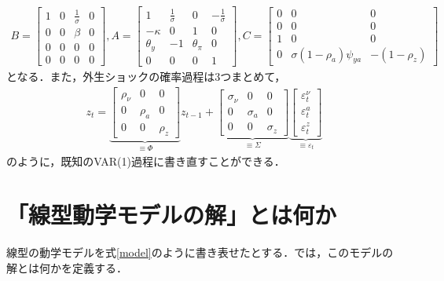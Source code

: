 \documentclass[a4j, dvipdfmx]{jarticle}
\begin{document}
\begin{align}
B = \begin{bmatrix}
1 & 0 & \frac{1}{\sigma} & 0 \\
0 & 0 & \beta & 0 \\
0 & 0 & 0 & 0 \\
0 & 0 & 0 & 0
\end{bmatrix},
A = \begin{bmatrix}
1 & \frac{1}{\sigma} & 0 & -\frac{1}{\sigma} \\
-\kappa & 0 & 1 & 0 \\
\theta_y & -1 & \theta_\pi & 0 \\
0 & 0 & 0 & 1
\end{bmatrix},
C = \begin{bmatrix}0 & 0 & 0 \\
0 & 0 & 0 \\
1 & 0 & 0 \\
0 & \sigma (1-\rho_a) \psi_{ya} & -(1-\rho_z)
\end{bmatrix}
\end{align}
となる．また，外生ショックの確率過程は3つまとめて，
\begin{align}
z_t = \underbrace{\begin{bmatrix}
\rho_\nu & 0 & 0 \\
0 & \rho_a & 0 \\
0 & 0 & \rho_z
\end{bmatrix}}_{\equiv \Phi} z_{t-1} + 
\underbrace{\begin{bmatrix}
\sigma_\nu & 0 & 0 \\
0 & \sigma_a & 0 \\
0 & 0 & \sigma_z
\end{bmatrix}}_{\equiv \Sigma} \underbrace{\begin{bmatrix}\varepsilon^\nu_t \\ \varepsilon^a_t \\ \varepsilon^z_t\end{bmatrix}}_{\equiv \varepsilon_t}
\end{align}
のように，既知のVAR(1)過程に書き直すことができる．

\section{「線型動学モデルの解」とは何か}

線型の動学モデルを式\eqref{model}のように書き表せたとする．では，このモデルの解とは何かを定義する．\\
\end{document}
